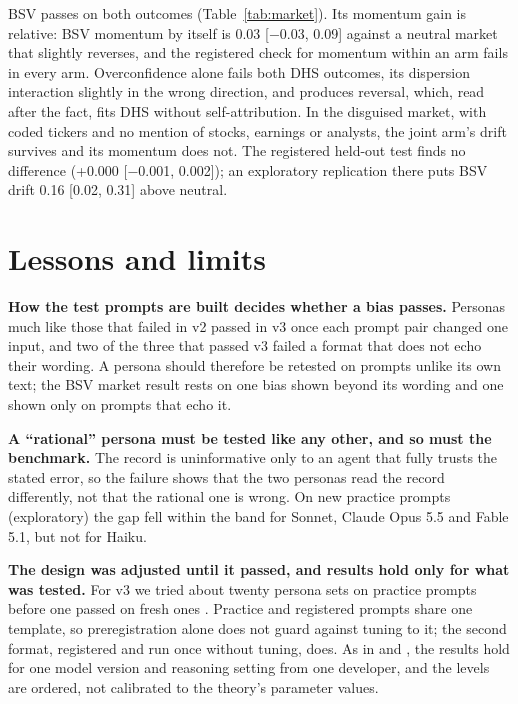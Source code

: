 \documentclass[10pt]{article}
\begin{document}
BSV passes on both outcomes (Table~\ref{tab:market}). Its momentum gain is relative: BSV momentum by itself is 0.03 [$-$0.03, 0.09] against a neutral market that slightly reverses, and the registered check for momentum within an arm fails in every arm. Overconfidence alone fails both DHS outcomes, its dispersion interaction slightly in the wrong direction, and produces reversal, which, read after the fact, fits DHS without self-attribution. In the disguised market, with coded tickers and no mention of stocks, earnings or analysts, the joint arm's drift survives and its momentum does not. The registered held-out test finds no difference (+0.000 [$-$0.001, 0.002]); an exploratory replication there puts BSV drift 0.16 [0.02, 0.31] above neutral.

\section{Lessons and limits}

\textbf{How the test prompts are built decides whether a bias passes.} Personas much like those that failed in v2 passed in v3 once each prompt pair changed one input, and two of the three that passed v3 failed a format that does not echo their wording. A persona should therefore be retested on prompts unlike its own text; the BSV market result rests on one bias shown beyond its wording and one shown only on prompts that echo it.

\textbf{A ``rational'' persona must be tested like any other, and so must the benchmark.} The record is uninformative only to an agent that fully trusts the stated error, so the failure shows that the two personas read the record differently, not that the rational one is wrong. On new practice prompts (exploratory) the gap fell within the band for Sonnet, Claude Opus 5.5 and Fable 5.1, but not for Haiku.

\textbf{The design was adjusted until it passed, and results hold only for what was tested.} For v3 we tried about twenty persona sets on practice prompts before one passed on fresh ones \citep{ludwig2025large}. Practice and registered prompts share one template, so preregistration alone does not guard against tuning to it; the second format, registered and run once without tuning, does. As in \citet{binz2023using} and \citet{bisbee2024synthetic}, the results hold for one model version and reasoning setting from one developer, and the levels are ordered, not calibrated to the theory's parameter values.



\end{document}
